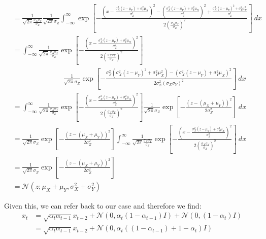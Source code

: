 \documentclass{article}
\numberwithin{equation}{section}
\numberwithin{figure}{section}
\begin{document}
{\begin{align*}
  &= \frac{1}{\sqrt{2 \pi} \frac{\sigma_X \sigma_Y}{\sigma_Z}} \frac{1}{\sqrt{2 \pi} \sigma_Z} \int_{-\infty}^{\infty} \exp\left[{-\frac{\left( x - \frac{\sigma_X^2 (z - \mu_Y) + \sigma_Y^2 \mu_X}{\sigma_Z^2}\right)^2 - \left( \frac{\sigma_X^2 (z - \mu_Y) + \sigma_Y^2 \mu_X}{\sigma_Z^2} \right)^2 + \frac{\sigma_X^2 (z - \mu_Y)^2 + \sigma_Y^2 \mu_X^2}{\sigma_Z^2}}{2 \left(\frac{\sigma_X \sigma_Y}{\sigma_Z}\right)^2}} \right] \: dx  \\[10pt]
  &= \int_{-\infty}^{\infty} \frac{1}{\sqrt{2 \pi} \frac{\sigma_X \sigma_Y}{\sigma_Z}} \exp\left[{-\frac{\left( x - \frac{\sigma_X^2 (z - \mu_Y) + \sigma_Y^2 \mu_X}{\sigma_Z^2}\right)^2}{2 \left(\frac{\sigma_X \sigma_Y}{\sigma_Z}\right)^2}} \right] \\[10pt]
  & \hspace{3cm} \frac{1}{\sqrt{2 \pi} \sigma_Z} \exp \left[ - \frac{\sigma_Z^2 \left( \sigma_X^2 (z - \mu_Y)^2 + \sigma_Y^2 \mu_X^2 \right) - \left( \sigma_X^2 (z - \mu_Y) + \sigma_Y^2 \mu_X \right)^2}{2 \sigma_Z^2 (\sigma_X \sigma_Y)^2} \right] \: dx  \\[10pt]
  &= \int_{-\infty}^{\infty} \frac{1}{\sqrt{2 \pi} \frac{\sigma_X \sigma_Y}{\sigma_Z}} \exp\left[{-\frac{\left( x - \frac{\sigma_X^2 (z - \mu_Y) + \sigma_Y^2 \mu_X}{\sigma_Z^2}\right)^2}{2 \left(\frac{\sigma_X \sigma_Y}{\sigma_Z}\right)^2}} \right] \frac{1}{\sqrt{2 \pi} \sigma_Z} \exp \left[ - \frac{(z - (\mu_X + \mu_Y))^2}{2 \sigma_Z^2} \right] \: dx  \\[10pt]
  &= \frac{1}{\sqrt{2 \pi} \sigma_Z} \exp \left[ - \frac{(z - (\mu_X + \mu_Y))^2}{2 \sigma_Z^2} \right] \int_{-\infty}^{\infty} \frac{1}{\sqrt{2 \pi} \frac{\sigma_X \sigma_Y}{\sigma_Z}} \exp\left[{-\frac{\left( x - \frac{\sigma_X^2 (z - \mu_Y) + \sigma_Y^2 \mu_X}{\sigma_Z^2}\right)^2}{2 \left(\frac{\sigma_X \sigma_Y}{\sigma_Z}\right)^2}} \right] \: dx  \\[10pt]
  &= \frac{1}{\sqrt{2 \pi} \sigma_Z} \exp \left[ - \frac{(z - (\mu_X + \mu_Y))^2}{2 \sigma_Z^2} \right] \\[10pt]
  &= \mathcal{N}\left(z; \mu_X + \mu_Y, \sigma_X^2 + \sigma_Y^2 \right)
\end{align*}
}

Given this, we can refer back to our case and therefore we find:
\begin{align*}
  x_t &= \sqrt{\alpha_t \alpha_{t-1}} x_{t-2} + \mathcal{N}\left(0, \alpha_t\left(1 - \alpha_{t-1}\right)I \right) + \mathcal{N}\left(0, (1 - \alpha_t) I \right) \\
  &= \sqrt{\alpha_t \alpha_{t-1}} x_{t-2} + \mathcal{N}\left(0, \alpha_t \left((1 - \alpha_{t-1}) + 1 - \alpha_t \right)I \right) 
\end{align*}

\newpage




\end{document}

